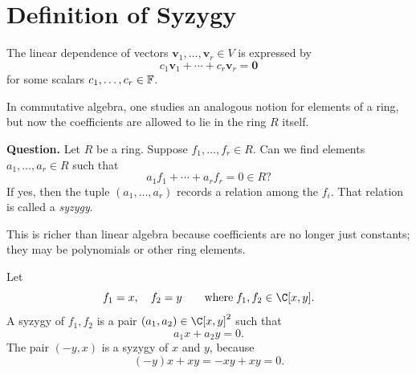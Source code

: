 \documentclass[11pt,openany]{article}
\begin{document}
\section{Definition of Syzygy}
\begin{observation}
The linear dependence of vectors \(\textbf{v}_1,\dots,\textbf{v}_r\in V\) is expressed by %
\[
c_1\textbf{v}_1+\cdots+c_r\textbf{v}_r=\textbf{0}
\]
for some scalars \(c_1,\dots,c_r\in\mathbb{F}\).

In commutative algebra, one studies an analogous notion for elements of a ring, but now the coefficients are allowed to lie in the ring \(R\) itself.

\medskip

\noindent
\textbf{\color{red}Question.}\; 
Let $R$ be a ring.
Suppose \(f_1,\dots,f_r\in R\).  
Can we find elements \(a_1,\dots,a_r\in R\) such that
\[
a_1f_1+\cdots+a_rf_r=0\in R?
\]
If yes, then the tuple \((a_1,\dots,a_r)\) records a relation among the \(f_i\).  
That relation is called a \emph{syzygy}.

\end{observation}

\medskip

\begin{remark}
This is richer than linear algebra because coefficients are no longer just constants; they may be polynomials or other ring elements.
\end{remark}

\medskip

\begin{example}
Let \[
f_1=x,\quad f_2=y\quad\quad\text{where}\; f_1,f_2\in\C[x,y].
\]
A syzygy of \(f_1,f_2\) is a pair \((a_1,a_2)\in \C[x,y]^2\) such that
\[
a_1x+a_2y=0.
\]
The pair $(-y,x)$ is a syzygy of \(x\) and \(y\), because
\[
(-y)x+xy=-xy+xy=0.
\]
\end{example}

\newpage
\end{document}
